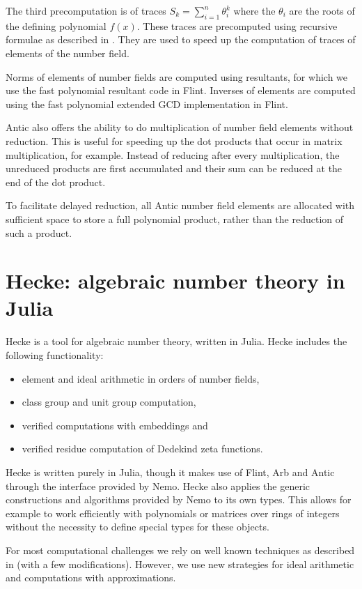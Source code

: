 \documentclass{sig-alternate-05-2015}
\begin{document}
The third precomputation is of traces $S_k = \sum_{i=1}^n \theta_i^k$ where the $\theta_i$
are the roots of the defining polynomial $f(x)$. These traces are precomputed using
recursive formulae as described in \cite{Cohen1993}. They are
used to speed up the computation of traces of elements of the number field.

Norms of elements of number fields are computed using resultants, for which we use
the fast polynomial resultant code in Flint. Inverses of elements are computed using the fast polynomial
extended GCD implementation in Flint.

Antic also offers the ability to do multiplication of number field elements without
reduction. This is useful for speeding up the dot products that occur in matrix
multiplication, for example. Instead of reducing after every multiplication, the unreduced
products are first accumulated and their sum can be reduced at the end of the dot product.

To facilitate delayed reduction, all Antic number field elements are allocated with
sufficient space to store a full polynomial product, rather than the reduction of such a product.

\section{Hecke: algebraic number theory in Julia}
\label{sect:hecke}

Hecke is a tool for algebraic number theory, written in Julia.
Hecke includes the following functionality:
\begin{itemize}
\item
  element and ideal arithmetic in orders of number fields,
\item
  class group and unit group computation,
\item
  verified computations with embeddings and
\item
  verified residue computation of Dedekind zeta functions.
\end{itemize}

Hecke is written purely in Julia, though it makes use of Flint, Arb and Antic through the interface provided by Nemo.
Hecke also applies the generic constructions and algorithms provided by Nemo to its own types. This allows for example to
work efficiently with polynomials or matrices over rings of integers without the necessity to define special types for these objects.

For most computational challenges we rely on well known techniques as described in \cite{Cohen1993, Pohst1997, Belabas2004}
(with a few modifications). However, we use new strategies for ideal arithmetic and computations with approximations.
\end{document}
